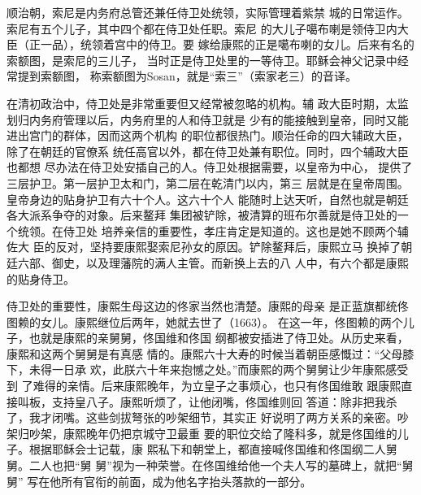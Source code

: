 \par
顺治朝，索尼是内务府总管还兼任侍卫处统领，实际管理着紫禁%
城的日常运作。索尼有五个儿子，其中四个都在侍卫处任职。索尼%
的大儿子噶布喇是领侍卫内大臣（正一品），统领着宫中的侍卫。要%
嫁给康熙的正是噶布喇的女儿。后来有名的索额图，是索尼的三儿子，%
当时正是侍卫处里的一等侍卫。耶稣会神父记录中经常提到索额图，%
称索额图为Sosan，就是“索三”（索家老三）的音译。%
\par
在清初政治中，侍卫处是非常重要但又经常被忽略的机构。辅%
政大臣时期，太监划归内务府管理以后，内务府里的人和侍卫就是%
少有的能接触到皇帝，同时又能进出宫门的群体，因而这两个机构%
的职位都很热门。顺治任命的四大辅政大臣，除了在朝廷的官僚系%
统任高官以外，都在侍卫处兼有职位。同时，四个辅政大臣也都想%
尽办法在侍卫处安插自己的人。侍卫处根据需要，以皇帝为中心，%
提供了三层护卫。第一层护卫太和门，第二层在乾清门以内，第三%
层就是在皇帝周围。皇帝身边的贴身护卫有六十个人。这六十个人%
能随时上达天听，自然也就是朝廷各大派系争夺的对象。后来鳌拜%
集团被铲除，被清算的班布尔善就是侍卫处的一个统领。在侍卫处%
培养亲信的重要性，孝庄肯定是知道的。这也是她不顾两个辅佐大%
臣的反对，坚持要康熙娶索尼孙女的原因。铲除鳌拜后，康熙立马%
换掉了朝廷六部、御史，以及理藩院的满人主管。而新换上去的八%
人中，有六个都是康熙的贴身侍卫。%
\par
侍卫处的重要性，康熙生母这边的佟家当然也清楚。康熙的母亲%
是正蓝旗都统佟图赖的女儿。康熙继位后两年，她就去世了（1663）。%
在这一年，佟图赖的两个儿子，也就是康熙的亲舅舅，佟国维和佟国%
纲都被安插进了侍卫处。从历史来看，康熙和这两个舅舅是有真感%
情的。康熙六十大寿的时候当着朝臣感慨过：“父母膝下，未得一日承%
欢，此朕六十年来抱憾之处。”而康熙的两个舅舅让少年康熙感受到%
了难得的亲情。后来康熙晚年，为立皇子之事烦心，也只有佟国维敢%
跟康熙直接叫板，支持皇八子。康熙听烦了，让他闭嘴，佟国维则回%
答道：除非把我杀了，我才闭嘴。这些剑拔弩张的吵架细节，其实正%
好说明了两方关系的亲密。吵架归吵架，康熙晚年仍把京城守卫最重%
要的职位交给了隆科多，就是佟国维的儿子。根据耶稣会士记载，康%
熙私下和朝堂上，都直接喊佟国维和佟国纲二人舅舅。二人也把“舅%
舅”视为一种荣誉。在佟国维给他一个夫人写的墓碑上，就把“舅舅”%
写在他所有官衔的前面，成为他名字抬头落款的一部分。%
